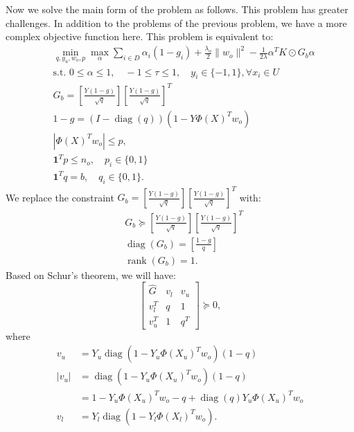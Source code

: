 \documentclass[12pt]{article}
\DeclareMathOperator{\diag}{diag}
\DeclareMathOperator{\rank}{rank}
\begin{document}
	Now we solve the main form of the problem as follows. This problem has greater challenges. In addition to the problems of the previous problem, we have a more complex objective function here. This problem is equivalent to:
	\begin{subequations}
		\label{eq:ral-main}
		\begin{align}
			&\min_{q, y_u, w_o, p} \max_{\alpha} \sum_{i \in D} \alpha_i (1 - g_i) + \frac{\lambda_o}{2}\|w_o\|^2 - \frac{1}{2\lambda} \alpha^T K \odot G_b \alpha \\
			&\text{s.t. } 0 \le \alpha \le 1, \quad -1 \le \tau \le 1, \quad y_i \in \{-1, 1\}, \forall x_i \in U \\
			&G_b = \left[\frac{Y(1-g)}{\sqrt{q}}\right] \left[\frac{Y(1-g)}{\sqrt{q}}\right]^T \\
			&1 - g = (I - \diag(q))(1 - Y \Phi(X)^T w_o) \\
			&|\Phi(X)^T w_o| \le p, \\
			&\mathbf{1}^T p \le n_o, \quad p_i \in \{0, 1\} \\
			&\mathbf{1}^T q = b, \quad q_i \in \{0, 1\}.
		\end{align}
	\end{subequations}
	We replace the constraint $G_b = \left[\frac{Y(1-g)}{\sqrt{q}}\right] \left[\frac{Y(1-g)}{\sqrt{q}}\right]^T$ with:
	\begin{subequations}
		\begin{align}
			&G_b \succeq \left[\frac{Y(1-g)}{\sqrt{q}}\right] \left[\frac{Y(1-g)}{\sqrt{q}}\right]^T \\
			&\diag(G_b) = \left[\frac{1-g}{q}\right] \\
			&\rank(G_b) = 1.
		\end{align}
	\end{subequations}
	Based on Schur's theorem, we will have:
	\begin{equation}
		\begin{bmatrix}
			\hat{G} & v_l & v_u \\
			v_l^T & q & 1 \\
			v_u^T & 1 & q^T
		\end{bmatrix} \succeq 0,
	\end{equation}
	where
	\begin{align}
		v_u &= Y_u \diag(1 - Y_u \Phi(X_u)^T w_o)(1 - q) \\
		|v_u| &= \diag(1 - Y_u \Phi(X_u)^T w_o)(1 - q) \\
		&= 1 - Y_u \Phi(X_u)^T w_o - q + \diag(q) Y_u \Phi(X_u)^T w_o \\
		v_l &= Y_l \diag(1 - Y_l \Phi(X_l)^T w_o).
	\end{align}
\end{document}
